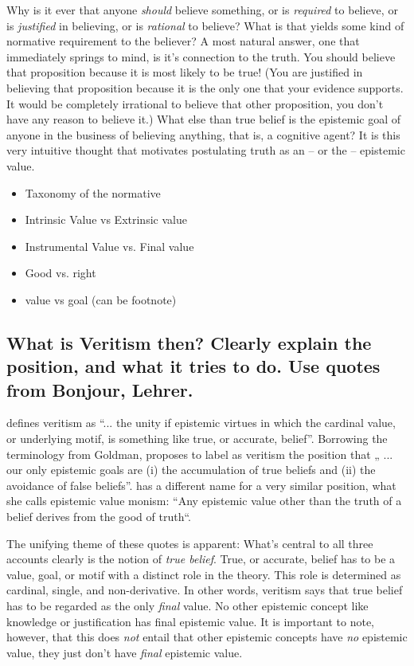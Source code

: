 \documentclass[11pt,numbers=noenddot]{scrartcl}
\begin{document}
Why is it ever that anyone \emph{should} believe something, or is \emph{required} to believe, or is \emph{justified} in believing, or is \emph{rational} to believe? What is that yields some kind of normative requirement to the believer? A most natural answer, one that immediately springs to mind, is it's connection to the truth. You should believe that proposition because it is most likely to be true! (You are justified in believing that proposition because it is the only one that your evidence supports. It would be completely irrational to believe that other proposition, you don't have any reason to believe it.) What else than true belief is the epistemic goal of anyone in the business of believing anything, that is, a cognitive agent? It is this very intuitive thought that motivates postulating truth as an -- or the -- epistemic value.
\begin{itemize}
    \item Taxonomy of the normative
    \item Intrinsic Value vs Extrinsic value 
    \item Instrumental Value vs. Final value 
    \item Good vs. right 
    \item value vs goal (can be footnote)
\end{itemize}

\subsection{What is Veritism then? Clearly explain the position, and what it tries to do. Use quotes from Bonjour, Lehrer.}

\citet[54]{Goldman2002-GOLTUO-2} defines veritism as  “... the unity if epistemic virtues in which the cardinal value, or underlying motif, is something like true, or accurate, belief”. Borrowing the terminology from Goldman, \citet[360]{Berker2013-BERETA-2} proposes to label as veritism the position that „ ... our only epistemic goals are (i) the accumulation of true beliefs and (ii) the avoidance of false beliefs”. \citet{Zagzebski2004-ZAGEVM-2} has a different name for a very similar position, what she calls epistemic value monism: “Any epistemic value other than the truth of a belief derives from the good of truth“.

The unifying theme of these quotes is apparent: What’s central to all three accounts clearly is the notion of \emph{true belief}. True, or accurate, belief has to be a value, goal, or motif with a distinct role in the theory. This role is determined as cardinal, single, and non-derivative. In other words, veritism says that true belief has to be regarded as the only \emph{final} value. No other epistemic concept like knowledge or justification has final epistemic value. It is important to note, however, that this does \emph{not} entail that other epistemic concepts have \emph{no} epistemic value, they just don’t have \emph{final} epistemic value.
\end{document}
